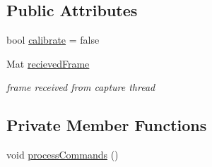 \subsection*{Public Attributes}
\begin{DoxyCompactItemize}
\item 
bool \hyperlink{class_gestro_1_1_capture_and_detect_acbe1ce90cb6a7bad1c94a6be68cc4f0b}{calibrate} = false
\item 
Mat \hyperlink{class_gestro_1_1_capture_and_detect_a5bd3dee8a4b9bffe627b1475a84da4e8}{recieved\+Frame}
\begin{DoxyCompactList}\small\item\em frame received from capture thread \end{DoxyCompactList}\end{DoxyCompactItemize}
\subsection*{Private Member Functions}
\begin{DoxyCompactItemize}
\item 
void \hyperlink{class_gestro_1_1_capture_and_detect_a5747ba4779f2f30b599c5082088841ed}{process\+Commands} ()
\end{DoxyCompactItemize}
